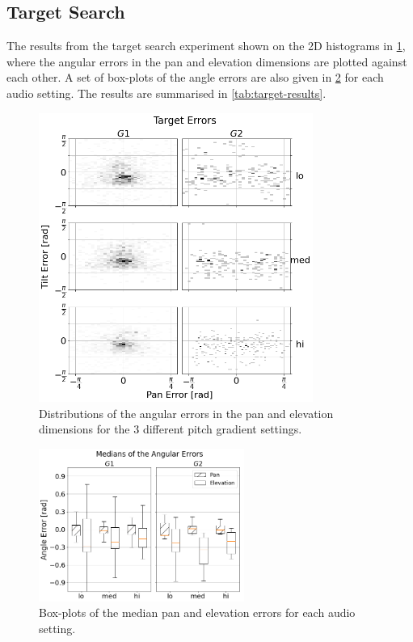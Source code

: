 \documentclass[acmsmall]{acmart}
\begin{document}
\subsection{Target Search}

The results from the target search experiment shown on the 2D histograms in \cref{fig:target-errors}, where the angular errors in the pan and elevation dimensions are plotted against each other. 
A set of box-plots of the angle errors are also given in \cref{fig:target-boxplot-error} for each audio setting.
The results are summarised in \cref{tab:target-results}.

\begin{figure}
  \centering
  \includegraphics[width=0.8\textwidth]{figures/target_errors.png}
  \caption{Distributions of the angular errors in the pan and elevation dimensions for the 3 different pitch gradient settings. }\label{fig:target-errors}
\end{figure}

\begin{figure}
  \centering
  \includegraphics[width=0.6\textwidth]{figures/boxplot_target_search_median_error.png}
  \caption{Box-plots of the median pan and elevation errors for each audio setting. }\label{fig:target-boxplot-error}
\end{figure}
\end{document}
